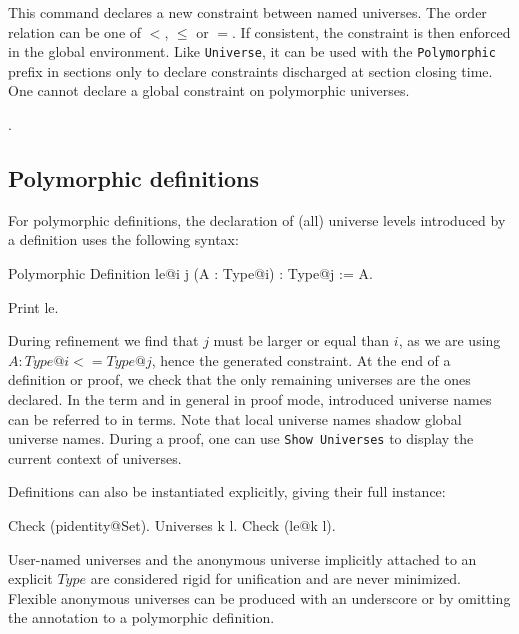 This command declares a new constraint between named universes.
The order relation can be one of $<$, $\le$ or $=$. If consistent,
the constraint is then enforced in the global environment. Like
\texttt{Universe}, it can be used with the \texttt{Polymorphic} prefix
in sections only to declare constraints discharged at section closing time.
One cannot declare a global constraint on polymorphic universes.

\begin{ErrMsgs}
\item {}.
\item {}
\end{ErrMsgs}

\subsection{Polymorphic definitions}
For polymorphic definitions, the declaration of (all) universe levels
introduced by a definition uses the following syntax:

\begin{coq_example*}
Polymorphic Definition le@{i j} (A : Type@{i}) : Type@{j} := A.
\end{coq_example*}
\begin{coq_example}
Print le.
\end{coq_example}

During refinement we find that $j$ must be larger or equal than $i$, as
we are using $A : Type@{i} <= Type@{j}$, hence the generated
constraint. At the end of a definition or proof, we check that the only
remaining universes are the ones declared. In the term and in general in
proof mode, introduced universe names can be referred to in
terms. Note that local universe names shadow global universe names.
During a proof, one can use \texttt{Show Universes} to display
the current context of universes.

Definitions can also be instantiated explicitly, giving their full instance:
\begin{coq_example}
Check (pidentity@{Set}).
Universes k l.
Check (le@{k l}).
\end{coq_example}

User-named universes and the anonymous universe implicitly attached to
an explicit $Type$ are considered rigid for unification and are never
minimized. Flexible anonymous universes can be produced with an
underscore or by omitting the annotation to a polymorphic definition.


